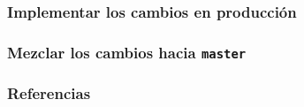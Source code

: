 \documentclass[10pt]{beamer}
\begin{document}
\begin{frame}
	\frametitle{Implementar los cambios en producción}
\end{frame}

\begin{frame}[fragile]
	\frametitle{Mezclar los cambios hacia \texttt{master}}
\end{frame}


\begin{frame}[allowframebreaks]
	\frametitle{Referencias}

	\printbibliography[heading=none]
	\nocite{*}
\end{frame}
\end{document}
